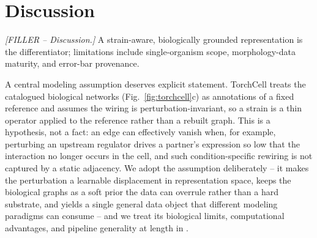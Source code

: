 \section{Discussion}\label{sec:discussion}
\textit{[FILLER -- Discussion.]} A strain-aware, biologically grounded
representation is the differentiator; limitations include single-organism scope,
morphology-data maturity, and error-bar provenance.

A central modeling assumption deserves explicit statement. TorchCell treats the catalogued
biological networks (Fig.~\ref{fig:torchcell}c) as annotations of a fixed reference and assumes
the wiring is perturbation-invariant, so a strain is a thin operator applied to the reference
rather than a rebuilt graph. This is a hypothesis, not a fact: an edge can effectively vanish
when, for example, perturbing an upstream regulator drives a partner's expression so low that
the interaction no longer occurs in the cell, and such condition-specific rewiring is not
captured by a static adjacency. We adopt the assumption deliberately -- it makes the
perturbation a learnable displacement in representation space, keeps the biological graphs as a
soft prior the data can overrule rather than a hard substrate, and yields a single general data
object that different modeling paradigms can consume -- and we treat its biological limits,
computational advantages, and pipeline generality at length in .
